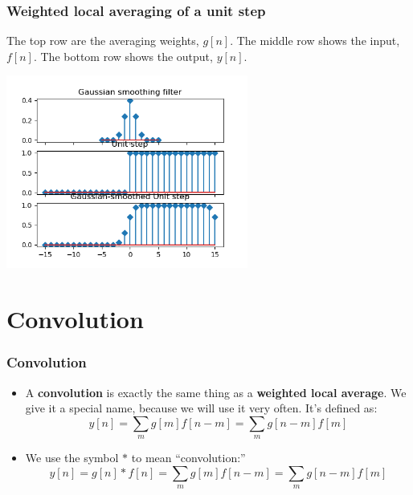 \documentclass{beamer}
\begin{document}
\begin{frame}
  \frametitle{Weighted local averaging of a unit step} The top row are
  the averaging weights, $g[n]$.  The middle row shows the input,
  $f[n]$.  The bottom row shows the output, $y[n]$.
  \centerline{\includegraphics[height=2.5in]{mp1fig6.png}}
\end{frame}

\section[Convolution]{Convolution}
\setcounter{subsection}{1}

\begin{frame}
  \frametitle{Convolution}
  \begin{itemize}
  \item A {\bf convolution} is exactly the same thing as a {\bf weighted local average}.
    We give it a special name, because we will use it very often.  It's defined as:
    \[
    y[n] = \sum_m g[m] f[n-m] = \sum_m g[n-m] f[m]
    \]
  \item 
    We use the symbol $\ast$ to mean ``convolution:''
    \[
    y[n]=g[n]\ast f[n] = \sum_m g[m] f[n-m] = \sum_m g[n-m] f[m]
    \]
  \end{itemize}
\end{frame}
\end{document}
